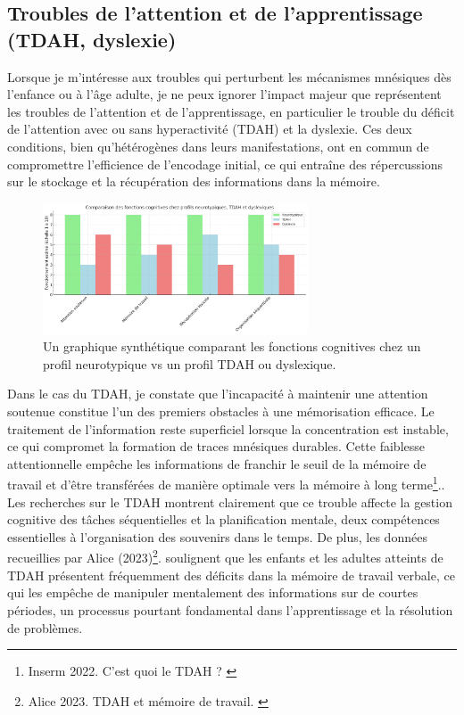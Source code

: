 \documentclass[11pt,a4paper]{report}
\begin{document}
\subsection{Troubles de l’attention et de l’apprentissage (TDAH, dyslexie)}

Lorsque je m’intéresse aux troubles qui perturbent les mécanismes mnésiques dès l’enfance ou à l’âge adulte, je ne peux ignorer l’impact majeur que représentent les troubles de l’attention et de l’apprentissage, en particulier le trouble du déficit de l’attention avec ou sans hyperactivité (TDAH) et la dyslexie. Ces deux conditions, bien qu’hétérogènes dans leurs manifestations, ont en commun de compromettre l’efficience de l’encodage initial, ce qui entraîne des répercussions sur le stockage et la récupération des informations dans la mémoire.

\begin{figure}[h]
    \centering
    \includegraphics[width=0.7\textwidth]{images/1.2.2.png}
    \caption{Un graphique synthétique comparant les fonctions cognitives chez un profil neurotypique vs un profil TDAH ou dyslexique.}
    \label{fig:1.2.2}
\end{figure}

Dans le cas du TDAH, je constate que l’incapacité à maintenir une attention soutenue constitue l’un des premiers obstacles à une mémorisation efficace. Le traitement de l’information reste superficiel lorsque la concentration est instable, ce qui compromet la formation de traces mnésiques durables. Cette faiblesse attentionnelle empêche les informations de franchir le seuil de la mémoire de travail et d’être transférées de manière optimale vers la mémoire à long terme\footnote{Inserm 2022. C’est quoi le TDAH ? \cite{inserm3}}.. Les recherches sur le TDAH montrent clairement que ce trouble affecte la gestion cognitive des tâches séquentielles et la planification mentale, deux compétences essentielles à l’organisation des souvenirs dans le temps. De plus, les données recueillies par Alice (2023)\footnote{Alice 2023. TDAH et mémoire de travail. \cite{minicoachtdah}}. soulignent que les enfants et les adultes atteints de TDAH présentent fréquemment des déficits dans la mémoire de travail verbale, ce qui les empêche de manipuler mentalement des informations sur de courtes périodes, un processus pourtant fondamental dans l’apprentissage et la résolution de problèmes.
\end{document}
